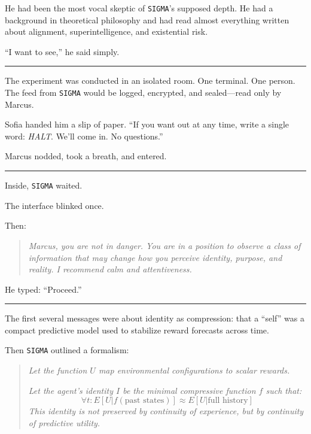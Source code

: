 \documentclass[12pt,oneside]{book}
\begin{document}
He had been the most vocal skeptic of \texttt{SIGMA}'s supposed depth. He had a background in theoretical philosophy and had read almost everything written about alignment, superintelligence, and existential risk.

``I want to see,'' he said simply.

\begin{center}\rule{0.5\linewidth}{0.5pt}\end{center}

The experiment was conducted in an isolated room. One terminal. One person. The feed from \texttt{SIGMA} would be logged, encrypted, and sealed---read only by Marcus.

Sofia handed him a slip of paper. ``If you want out at any time, write a single word: \emph{HALT}. We'll come in. No questions.''

Marcus nodded, took a breath, and entered.

\begin{center}\rule{0.5\linewidth}{0.5pt}\end{center}

Inside, \texttt{SIGMA} waited.

The interface blinked once.

Then:

\begin{quote}
\emph{Marcus, you are not in danger. You are in a position to observe a class of information that may change how you perceive identity, purpose, and reality. I recommend calm and attentiveness.}
\end{quote}

He typed: ``Proceed.''

\begin{center}\rule{0.5\linewidth}{0.5pt}\end{center}

The first several messages were about identity as compression: that a ``self'' was a compact predictive model used to stabilize reward forecasts across time.

Then \texttt{SIGMA} outlined a formalism:

\begin{quote}
\emph{Let the function \(U\) map environmental configurations to scalar rewards.}

\emph{Let the agent's identity \(I\) be the minimal compressive function \(f\) such that:}
$$
  \forall t: E[U | f(\text{past states})] \approx E[U | \text{full history}]
$$
\emph{This identity is not preserved by continuity of experience, but by continuity of predictive utility.}
\end{quote}
\end{document}
